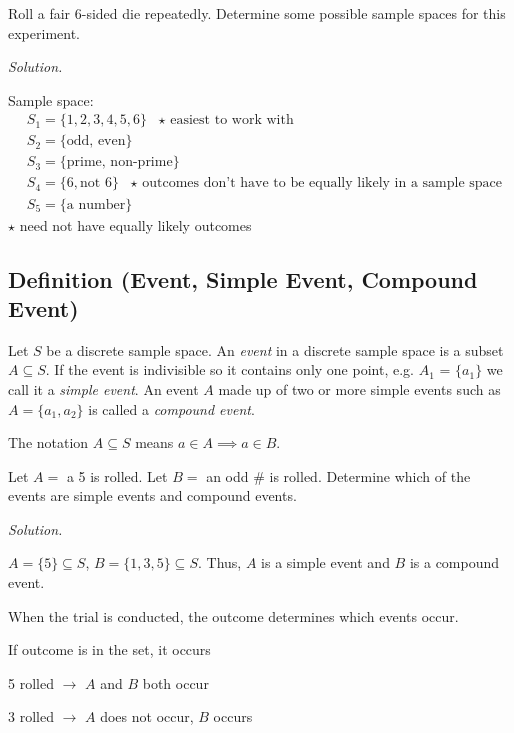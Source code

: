 
Roll a fair 6-sided die repeatedly. Determine some possible sample spaces
for this experiment.

\emph{Solution.}

Sample space:
\begin{align*}
    &S_1=\{1,2,3,4,5,6\} \text{ $\star$ easiest to work with}\\
    &S_2=\{\text{odd, even}\}\\
    &S_3=\{\text{prime, non-prime}\}\\
    &S_4=\{6, \text{not } 6\}\text{ $\star$ outcomes don't have to be equally likely
    in a sample space}\\
    &S_5=\{\text{a number}\}
\end{align*}
$\star$ need not have equally likely outcomes

\begin{defbox}
    \subsection{Definition (Event, Simple Event, Compound Event)}
    Let $ S $ be a discrete sample space. An \emph{event} in a discrete
    sample space is a subset $ A\subseteq S $. If the event is indivisible so it
    contains only one point, e.g. $A_1$ = $ \{a_1\} $ we call it a \emph{simple event}.
    An event $A$ made up of two or more simple events
    such as $ A=\{a_1,a_2\} $ is called a \emph{compound event}.
\end{defbox}
\begin{remark}
    The notation $ A\subseteq S $ means $ a\in A \implies a\in B $.
\end{remark}


Let $ A= $ a 5 is rolled. Let $ B= $ an odd \# is rolled. Determine which of
the events are simple events and compound events.

\emph{Solution.}

$ A=\{5\}\subseteq S $, $ B=\{1,3,5\}\subseteq S $. Thus,
$ A $ is a simple event and $ B $ is a compound event.

When the trial is conducted, the outcome determines which events
occur.

If outcome is in the set, it occurs

5 rolled $ \rightarrow $ $ A $ and $ B $ both occur

3 rolled $ \rightarrow $ $ A $ does not occur, $ B $ occurs

